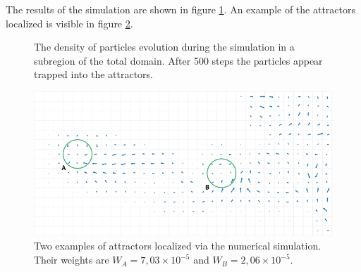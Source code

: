 \documentclass[a4paper]{article}
\begin{document}
The results of the simulation are shown in figure \ref{fig:simulation}. An example of the attractors localized is visible in figure \ref{fig:attractors}.


\begin{figure}[htb]
  \caption{The density of particles evolution during the simulation in a subregion of the total domain. After 500 steps the particles appear trapped into the attractors.}
  \label{fig:simulation}
\end{figure}


\begin{figure}[htb]
  \includegraphics[width=\linewidth]{img/03_attractors.png}
  \caption{Two examples of attractors localized via the numerical simulation. Their weights are $W_A = 7,03 \times 10^{-5}$ and $W_B = 2,06 \times 10^{-5}$.}
  \label{fig:attractors}
\end{figure}
\end{document}

